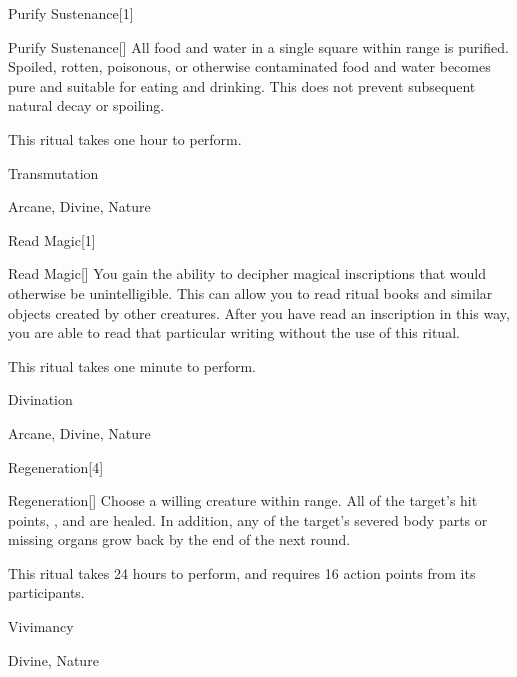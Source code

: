 \begin{spellsection}{Purify Sustenance}[1]


\begin{ability}{Purify Sustenance}[]
All food and water in a single square within \rngclose range is purified.
Spoiled, rotten, poisonous, or otherwise contaminated food and water becomes pure and suitable for eating and drinking.
This does not prevent subsequent natural decay or spoiling.

This ritual takes one hour to perform.
\end{ability}




 Transmutation

 Arcane, Divine, Nature
\end{spellsection}


\begin{spellsection}{Read Magic}[1]


\begin{ability}{Read Magic}[]
You gain the ability to decipher magical inscriptions that would otherwise be unintelligible.
This can allow you to read ritual books and similar objects created by other creatures.
After you have read an inscription in this way, you are able to read that particular writing without the use of this ritual.

This ritual takes one minute to perform.
\end{ability}




 Divination

 Arcane, Divine, Nature
\end{spellsection}


\begin{spellsection}{Regeneration}[4]


\begin{ability}{Regeneration}[]
Choose a willing creature within \rngclose range.
All of the target's hit points, , and  are healed.
In addition, any of the target's severed body parts or missing organs grow back by the end of the next round.

This ritual takes 24 hours to perform, and requires 16 action points from its participants.
\end{ability}




 Vivimancy

 Divine, Nature
\end{spellsection}


